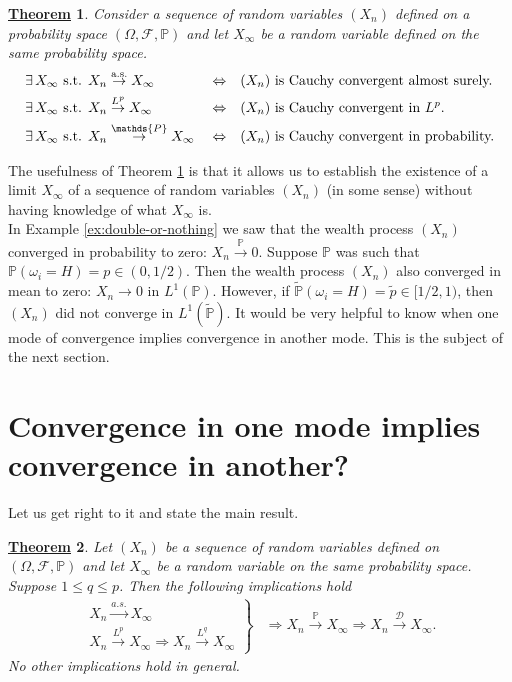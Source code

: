 \documentclass[12pt]{book}
\numberwithin{equation}{chapter}
\theoremstyle{plain}
\newtheorem{theorem}{\underline{Theorem}}
\numberwithin{theorem}{section}
\theoremstyle{definition}
\numberwithin{exercise}{chapter}
\newcommand{\<}{\langle}
\renewcommand{\>}{\rangle}
\renewcommand{\(}{\left(}
\renewcommand{\)}{\right)}
\renewcommand{\[}{\left[}
\renewcommand{\]}{\right]}
\newcommand\Pb{\mathds{P}}
\newcommand\Dc{\mathscr{D}}
\newcommand\Fc{\mathscr{F}}
\newcommand\om{\omega}
\newcommand\Om{\Omega}
\newcommand\Pbt{\widetilde{\Pb}}
\begin{document}
\begin{theorem}
\label{thm:cauchy.convergent}
Consider a sequence of random variables $(X_n)$ defined on a probability space $(\Om,\Fc,\Pb)$ and let $X_\infty$ be a random variable defined on the same probability space.
\begin{align}
&\exists \, X_\infty \text{ s.t. } X_n \stackrel{\textup{a.s.}}{\to} X_\infty&
&\Leftrightarrow&
&\text{$(X_n)$ is Cauchy convergent almost surely.} \\
&\exists \, X_\infty \text{ s.t. } X_n \stackrel{\textup{$L^p$}}{\to} X_\infty&
&\Leftrightarrow&
&\text{$(X_n)$ is Cauchy convergent in $L^p$.} \\
&\exists \, X_\infty \text{ s.t. } X_n \stackrel{\Pb}{\to} X_\infty&
&\Leftrightarrow&
&\text{$(X_n)$ is Cauchy convergent in probability.} 
\end{align}
\end{theorem}

\noindent
The usefulness of Theorem \ref{thm:cauchy.convergent} is that it allows us to establish the existence of a limit $X_\infty$ of a sequence of random variables $(X_n)$ (in some sense) without having knowledge of what $X_\infty$ is.
\\[0.5em]
In Example \ref{ex:double-or-nothing} we saw that the wealth process $(X_n)$ converged in probability to zero: $X_n \stackrel{\Pb}{\to} 0$.  Suppose $\Pb$ was such that $\Pb(\om_i=H) = p \in (0,1/2)$.  Then the wealth process $(X_n)$ also converged in mean to zero: $X_n \to 0$ in $L^1(\Pb)$.  However, if $\Pbt(\om_i=H) = \widetilde{p} \in [1/2,1)$, then $(X_n)$ did not converge in $L^1(\Pbt)$.  It would be very helpful to know when one mode of convergence implies convergence in another mode.  This is the subject of the next section.


\section{Convergence in one mode implies convergence in another?}
Let us get right to it and state the main result.
\begin{theorem}
\label{thm:convergence.of.RVs}
Let $(X_n)$ be a sequence of random variables defined on $(\Om,\Fc,\Pb)$ and let $X_\infty$ be a random variable on the same probability space.  
Suppose $1 \leq q \leq p$.
Then the following implications hold
\begin{align}
\left. \begin{array}{r}
X_n \stackrel{a.s.}{\to} X_\infty \\
X_n \stackrel{L^p}{\to} X_\infty 
\Rightarrow
X_n \stackrel{L^q}{\to} X_\infty 
\end{array} \right\}
	&\Rightarrow
	X_n \stackrel{\Pb}{\to} X_\infty
	\Rightarrow
	X_n \stackrel{\Dc}{\to} X_\infty . \label{eq:modes}
\end{align}
No other implications hold in general.
\end{theorem}
\end{document}
